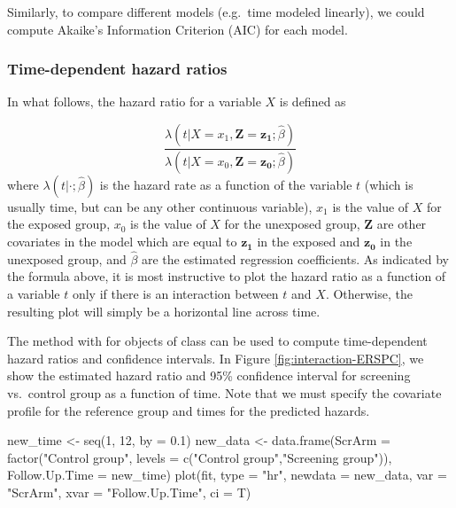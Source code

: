 Similarly, to compare different models (e.g.~time modeled linearly), we
could compute Akaike's Information Criterion (AIC) for each model.

\hypertarget{time-dependent-hazard-ratios}{%
\subsubsection{Time-dependent hazard
ratios}\label{time-dependent-hazard-ratios}}

In what follows, the hazard ratio for a variable \(X\) is defined as

\[
\frac{\lambda\left(t | X=x_1, \mathbf{Z}=\mathbf{z_1} ; \hat{\beta}\right)}{\lambda(t | X=x_0, \mathbf{Z}=\mathbf{z_0} ; \hat{\beta})}
\] where \(\lambda(t|\cdot;\hat{\beta})\) is the hazard rate as a
function of the variable \(t\) (which is usually time, but can be any
other continuous variable), \(x_1\) is the value of \(X\) for the
exposed group, \(x_0\) is the value of \(X\) for the unexposed group,
\(\mathbf{Z}\) are other covariates in the model which are equal to
\(\mathbf{z_1}\) in the exposed and \(\mathbf{z_0}\) in the unexposed
group, and \(\hat{\beta}\) are the estimated regression coefficients. As
indicated by the formula above, it is most instructive to plot the
hazard ratio as a function of a variable \(t\) only if there is an
interaction between \(t\) and \(X\). Otherwise, the resulting plot will
simply be a horizontal line across time.

The  method with  for objects of class
 can be used to compute time-dependent hazard ratios
and confidence intervals. In Figure \ref{fig:interaction-ERSPC}, we show
the estimated hazard ratio and 95\% confidence interval for screening
vs.~control group as a function of time. Note that we must specify the
covariate profile for the reference group and times for the predicted
hazards.

\begin{Schunk}
\begin{Sinput}
new_time <- seq(1, 12, by  = 0.1)
new_data <- data.frame(ScrArm = factor("Control group",
                                         levels = c("Control group","Screening group")),
                      Follow.Up.Time = new_time)
plot(fit, type = "hr", newdata = new_data,
     var = "ScrArm", xvar = "Follow.Up.Time", ci = T)
\end{Sinput}
\end{Schunk}


